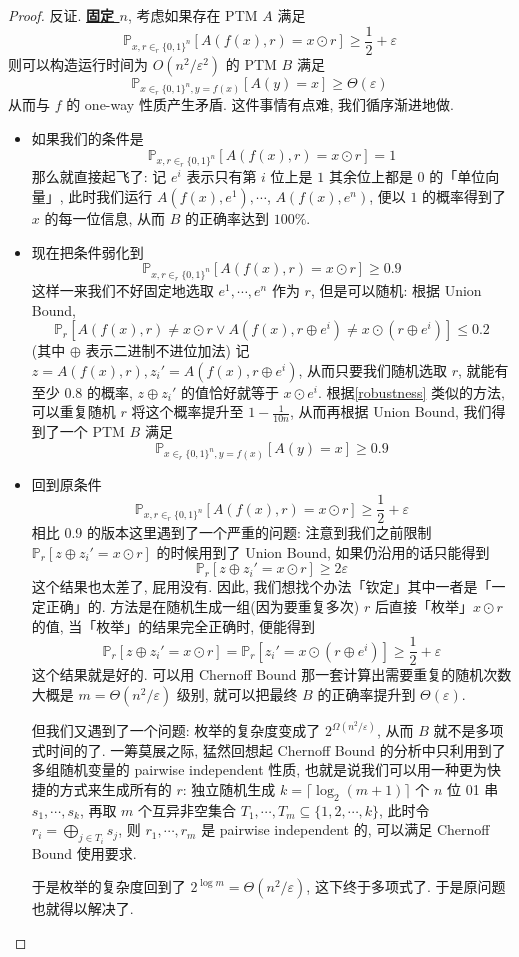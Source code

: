 \documentclass[8pt]{article}
\theoremstyle{compact}
\def\obj#1{\textbf{\uline{#1}}}
\def\le{\leqslant}
\def\ge{\geqslant}
\begin{document}
\begin{proof}
	反证. \obj{固定 $n$}, 考虑如果存在 PTM $A$ 满足 $$\mathbb P_{x, r \in_r \{0, 1\}^n }[A(f(x), r) = x \odot r] \ge \frac12 + \varepsilon$$ 则可以构造运行时间为 $O(n^2 / \varepsilon^2)$ 的 PTM $B$ 满足 $$\mathbb P_{x\in_r \{0, 1\}^n, y = f(x)}[A(y) = x] \ge \Theta(\varepsilon)$$ 从而与 $f$ 的 one-way 性质产生矛盾. 这件事情有点难, 我们循序渐进地做. \begin{itemize}
		\item 如果我们的条件是 $$\mathbb P_{x, r \in_r \{0, 1\}^n }[A(f(x), r) = x \odot r] = 1$$ 那么就直接起飞了: 记 $e^i$ 表示只有第 $i$ 位上是 $1$ 其余位上都是 $0$ 的「单位向量」, 此时我们运行 $A(f(x), e^1), \cdots$, $A(f(x), e^n)$, 便以 $1$ 的概率得到了 $x$ 的每一位信息, 从而 $B$ 的正确率达到 $100\%$.
		\item 现在把条件弱化到 $$\mathbb P_{x, r \in_r \{0, 1\}^n }[A(f(x), r) = x \odot r] \ge 0.9$$ 这样一来我们不好固定地选取 $e^1, \cdots, e^n$ 作为 $r$, 但是可以随机: 根据 Union Bound, $$\mathbb P_r[A(f(x), r) \neq x \odot r \vee A(f(x), r \oplus e^i) \neq x \odot (r \oplus e^i)] \le 0.2$$ (其中 $\oplus$ 表示二进制不进位加法) 记 $z = A(f(x), r), z_i' = A(f(x), r \oplus e^i)$, 从而只要我们随机选取 $r$, 就能有至少 $0.8$ 的概率, $z \oplus z_i'$ 的值恰好就等于 $x \odot e^i$. 根据\cref{robustness} 类似的方法, 可以重复随机 $r$ 将这个概率提升至 $1 - \frac{1}{10n}$, 从而再根据 Union Bound, 我们得到了一个 PTM $B$ 满足 $$\mathbb P_{x\in_r \{0, 1\}^n, y = f(x)}[A(y) = x] \ge 0.9$$
		\item 回到原条件 $$\mathbb P_{x, r \in_r \{0, 1\}^n }[A(f(x), r) = x \odot r] \ge \frac12 + \varepsilon$$ 相比 0.9 的版本这里遇到了一个严重的问题: 注意到我们之前限制 $\mathbb P_r[z \oplus z_i' = x \odot r]$ 的时候用到了 Union Bound, 如果仍沿用的话只能得到 $$\mathbb P_r[z \oplus z_i' = x \odot r] \ge 2\varepsilon$$ 这个结果也太差了, 屁用没有. 因此, 我们想找个办法「钦定」其中一者是「一定正确」的. 方法是在随机生成一组(因为要重复多次) $r$ 后直接「枚举」$x \odot r$ 的值, 当「枚举」的结果完全正确时, 便能得到 $$\mathbb P_r[z \oplus z_i' = x \odot r] = \mathbb P_r[z_i' = x \odot (r \oplus e^i)] \ge \frac12 + \varepsilon$$ 这个结果就是好的. 可以用 Chernoff Bound 那一套计算出需要重复的随机次数大概是 $m = \Theta(n^2 / \varepsilon)$ 级别, 就可以把最终 $B$ 的正确率提升到 $\Theta(\varepsilon)$.
		
		但我们又遇到了一个问题: 枚举的复杂度变成了 $2^{\Omega(n^2 / \varepsilon)}$, 从而 $B$ 就不是多项式时间的了. 一筹莫展之际, 猛然回想起 Chernoff Bound 的分析中只利用到了多组随机变量的 pairwise independent 性质, 也就是说我们可以用一种更为快捷的方式来生成所有的 $r$: 独立随机生成 $k = \lceil \log_2 (m + 1) \rceil$ 个 $n$ 位 01 串 $s_1, \cdots, s_k$, 再取 $m$ 个互异非空集合 $T_1, \cdots, T_m \subseteq \{1, 2, \cdots, k\}$, 此时令 $r_i = \bigoplus_{j \in T_i} s_j$, 则 $r_1, \cdots, r_m$ 是 pairwise independent 的, 可以满足 Chernoff Bound 使用要求.

		于是枚举的复杂度回到了 $2^{\log m} = \Theta(n^2 / \varepsilon)$, 这下终于多项式了. 于是原问题也就得以解决了.
	\end{itemize}
	
	


\end{proof}
\end{document}
